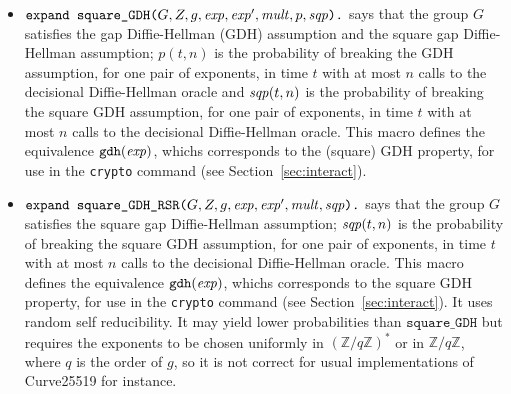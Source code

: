 \documentclass{article}
\begin{document}
\begin{itemize}
\begin{itemize}
\begin{itemize}
     \item
       $\texttt{expand\ square\_GDH(}G, Z, g, \mathit{exp}, \mathit{exp}',
       \mathit{mult}, p, \mathit{sqp}\texttt{).}$
       says that the group $G$ satisfies the gap Diffie-Hellman (GDH)
       assumption and the square gap Diffie-Hellman assumption;
       $p(t,n)$ is the probability of breaking the GDH assumption, for
       one pair of exponents, in time $t$ with at most $n$ 
       calls to the decisional Diffie-Hellman oracle and $\mathit{sqp}(t,n)$ is the
       probability of breaking the square GDH assumption, for one pair
       of exponents, in time $t$ with at most $n$ 
       calls to the decisional Diffie-Hellman oracle.  This macro defines the equivalence
       $\texttt{gdh}(\mathit{exp})$, whichs corresponds to the (square)
       GDH property, for use in the \texttt{crypto} command (see
       Section~\ref{sec:interact}).

     \item $\texttt{expand\ square\_GDH\_RSR(}G, Z, g, \mathit{exp}, \mathit{exp}',
       \mathit{mult}, \mathit{sqp}\texttt{).}$
       says that the group $G$ satisfies the square gap Diffie-Hellman assumption;
       $\mathit{sqp}(t,n)$ is the
       probability of breaking the square GDH assumption, for one pair
       of exponents, in time $t$ with at most $n$ 
       calls to the decisional Diffie-Hellman oracle.  This macro defines the equivalence
       $\texttt{gdh}(\mathit{exp})$, whichs corresponds to the square
       GDH property, for use in the \texttt{crypto} command (see
       Section~\ref{sec:interact}). It uses random self
       reducibility. It may yield lower probabilities than
       $\texttt{square\_GDH}$ but requires the exponents to be chosen
       uniformly in $(\mathbb{Z}/q\mathbb{Z})^*$ or in $\mathbb{Z}/q\mathbb{Z}$, where $q$ is the order
       of $g$, so it is not correct for usual implementations of Curve25519 for instance.


\end{itemize}
\end{itemize}
\end{itemize}
\end{document}
